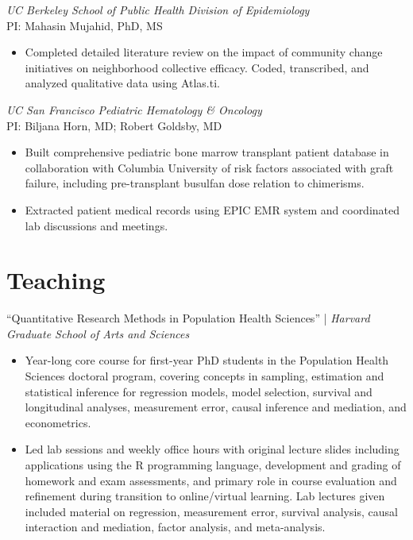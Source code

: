 \documentclass{cv_style}
\begin{document}
\textit{UC Berkeley School of Public Health Division of Epidemiology} \\
PI: Mahasin Mujahid, PhD, MS
\begin{itemize}
    \item Completed detailed literature review on the impact of community change initiatives on neighborhood collective efficacy. Coded, transcribed, and analyzed qualitative data using Atlas.ti.
\end{itemize}

\textit{UC San Francisco Pediatric Hematology \& Oncology} \\
PI: Biljana Horn, MD; Robert Goldsby, MD
\begin{itemize}
    \item Built comprehensive pediatric bone marrow transplant patient database in collaboration with Columbia University of risk factors associated with graft failure, including pre-transplant busulfan dose relation to chimerisms.
    \item \parskip 1pt Extracted patient medical records using EPIC EMR system and coordinated lab discussions and meetings.
\end{itemize}


\parskip -5pt 
\section{Teaching}

``Quantitative Research Methods in Population Health Sciences'' | \textit{Harvard Graduate School of Arts and Sciences}
\begin{itemize}
  \vspace{0em} \item Year-long core course for first-year PhD students in the Population Health Sciences doctoral program, covering concepts in sampling, estimation and statistical inference for regression models, model selection, survival and longitudinal analyses, measurement error, causal inference and mediation, and econometrics. 
  \item \parskip 1pt Led lab sessions and weekly office hours with original lecture slides including applications using the R programming language, development and grading of homework and exam assessments, and primary role in course evaluation and refinement during transition to online/virtual learning. Lab lectures given included material on regression, measurement error, survival analysis, causal interaction and mediation, factor analysis, and meta-analysis.
\end{itemize}
\end{document}
